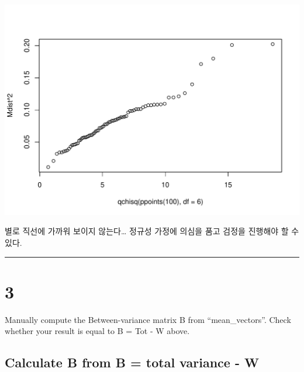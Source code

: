\documentclass[
]{article}
\begin{document}
\begin{center}\includegraphics[width=0.8\linewidth]{multivariate_lab_hw2_files/figure-latex/unnamed-chunk-3-1} \end{center}

별로 직선에 가까워 보이지 않는다\ldots{} 정규성 가정에 의심을 품고
검정을 진행해야 할 수 있다.

\begin{center}\rule{0.5\linewidth}{0.5pt}\end{center}

\section{3}\label{section-2}

Manually compute the Between-variance matrix B from ``mean\_vectors''.
Check whether your result is equal to B = Tot - W above.

\subsection{Calculate B from B = total variance -
W}\label{calculate-b-from-b-total-variance---w}
\end{document}
